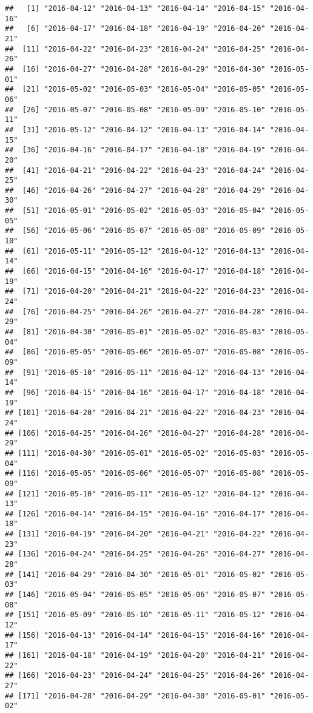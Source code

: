 \documentclass[
]{article}
\begin{document}
\begin{verbatim}
##   [1] "2016-04-12" "2016-04-13" "2016-04-14" "2016-04-15" "2016-04-16"
##   [6] "2016-04-17" "2016-04-18" "2016-04-19" "2016-04-20" "2016-04-21"
##  [11] "2016-04-22" "2016-04-23" "2016-04-24" "2016-04-25" "2016-04-26"
##  [16] "2016-04-27" "2016-04-28" "2016-04-29" "2016-04-30" "2016-05-01"
##  [21] "2016-05-02" "2016-05-03" "2016-05-04" "2016-05-05" "2016-05-06"
##  [26] "2016-05-07" "2016-05-08" "2016-05-09" "2016-05-10" "2016-05-11"
##  [31] "2016-05-12" "2016-04-12" "2016-04-13" "2016-04-14" "2016-04-15"
##  [36] "2016-04-16" "2016-04-17" "2016-04-18" "2016-04-19" "2016-04-20"
##  [41] "2016-04-21" "2016-04-22" "2016-04-23" "2016-04-24" "2016-04-25"
##  [46] "2016-04-26" "2016-04-27" "2016-04-28" "2016-04-29" "2016-04-30"
##  [51] "2016-05-01" "2016-05-02" "2016-05-03" "2016-05-04" "2016-05-05"
##  [56] "2016-05-06" "2016-05-07" "2016-05-08" "2016-05-09" "2016-05-10"
##  [61] "2016-05-11" "2016-05-12" "2016-04-12" "2016-04-13" "2016-04-14"
##  [66] "2016-04-15" "2016-04-16" "2016-04-17" "2016-04-18" "2016-04-19"
##  [71] "2016-04-20" "2016-04-21" "2016-04-22" "2016-04-23" "2016-04-24"
##  [76] "2016-04-25" "2016-04-26" "2016-04-27" "2016-04-28" "2016-04-29"
##  [81] "2016-04-30" "2016-05-01" "2016-05-02" "2016-05-03" "2016-05-04"
##  [86] "2016-05-05" "2016-05-06" "2016-05-07" "2016-05-08" "2016-05-09"
##  [91] "2016-05-10" "2016-05-11" "2016-04-12" "2016-04-13" "2016-04-14"
##  [96] "2016-04-15" "2016-04-16" "2016-04-17" "2016-04-18" "2016-04-19"
## [101] "2016-04-20" "2016-04-21" "2016-04-22" "2016-04-23" "2016-04-24"
## [106] "2016-04-25" "2016-04-26" "2016-04-27" "2016-04-28" "2016-04-29"
## [111] "2016-04-30" "2016-05-01" "2016-05-02" "2016-05-03" "2016-05-04"
## [116] "2016-05-05" "2016-05-06" "2016-05-07" "2016-05-08" "2016-05-09"
## [121] "2016-05-10" "2016-05-11" "2016-05-12" "2016-04-12" "2016-04-13"
## [126] "2016-04-14" "2016-04-15" "2016-04-16" "2016-04-17" "2016-04-18"
## [131] "2016-04-19" "2016-04-20" "2016-04-21" "2016-04-22" "2016-04-23"
## [136] "2016-04-24" "2016-04-25" "2016-04-26" "2016-04-27" "2016-04-28"
## [141] "2016-04-29" "2016-04-30" "2016-05-01" "2016-05-02" "2016-05-03"
## [146] "2016-05-04" "2016-05-05" "2016-05-06" "2016-05-07" "2016-05-08"
## [151] "2016-05-09" "2016-05-10" "2016-05-11" "2016-05-12" "2016-04-12"
## [156] "2016-04-13" "2016-04-14" "2016-04-15" "2016-04-16" "2016-04-17"
## [161] "2016-04-18" "2016-04-19" "2016-04-20" "2016-04-21" "2016-04-22"
## [166] "2016-04-23" "2016-04-24" "2016-04-25" "2016-04-26" "2016-04-27"
## [171] "2016-04-28" "2016-04-29" "2016-04-30" "2016-05-01" "2016-05-02"

\end{verbatim}
\end{document}
